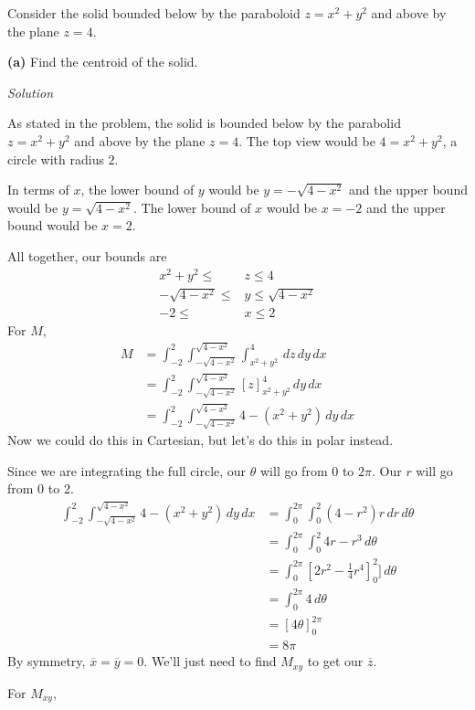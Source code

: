 \documentclass{article}
\newcommand{\lrb}[1]{\left[ #1 \right]}
\newcommand{\Solution}{\textit{Solution}}
\begin{document}
Consider the solid bounded below by the paraboloid $z = x^2+ y^2$ and above by the plane $z = 4$.

\textbf{(a)} Find the centroid of the solid.

\Solution

As stated in the problem, the solid is bounded below by the parabolid $z=x^2+y^2$ and above by the plane $z=4$. The top view would be $4=x^2+y^2$, a circle with radius $2$.

In terms of $x$, the lower bound of $y$ would be $y=-\sqrt{4-x^2}$ and the upper bound would be $y=\sqrt{4-x^2}$. The lower bound of $x$ would be $x=-2$ and the upper bound would be $x=2$.

All together, our bounds are
\begin{align*}
    x^2+y^2\leq &z \leq 4\\
    -\sqrt{4-x^2}\leq &y\leq \sqrt{4-x^2}\\
    -2\leq &x\leq 2
\end{align*}
For $M$,
\begin{align*}
    M&=\int_{-2}^2\int_{-\sqrt{4-x^2}}^{\sqrt{4-x^2}}\int_{x^2+y^2}^4 \,dz\,dy\,dx\\
    &=\int_{-2}^2\int_{-\sqrt{4-x^2}}^{\sqrt{4-x^2}}\lrb{z}_{x^2+y^2}^4\,dy\,dx\\
    &=\int_{-2}^2\int_{-\sqrt{4-x^2}}^{\sqrt{4-x^2}} 4-(x^2+y^2)\,dy\,dx
\end{align*}
Now we could do this in Cartesian, but let's do this in polar instead.

Since we are integrating the full circle, our $\theta$ will go from $0$ to $2\pi$. Our $r$ will go from $0$ to $2$.
\begin{align*}
    \int_{-2}^2\int_{-\sqrt{4-x^2}}^{\sqrt{4-x^2}} 4-(x^2+y^2)\,dy\,dx&=\int_0^{2\pi}\int_0^2 (4-r^2)r\,dr\,d\theta\tag{in polar, $x^2+y^2=r^2$}\\
    &=\int_0^{2\pi}\int_0^2 4r-r^3\,d\theta\\
    &=\int_0^{2\pi} \lrb{2r^2-\frac{1}{4}r^4}_0^2]\,d\theta\\
    &=\int_0^{2\pi} 4\,d\theta\\
    &=\lrb{4\theta}_0^{2\pi}\\
    &=8\pi
\end{align*}
By symmetry, $\overline{x}=\overline{y}=0$. We'll just need to find $M_{xy}$ to get our $\overline{z}$.

For $M_{xy}$,
\end{document}
